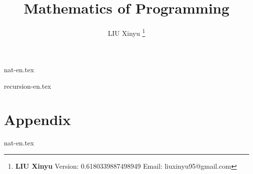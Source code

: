 \documentclass[UTF8, a4paper,twoside]{book} %
\begin{document}


\title{{\bf \Huge Mathematics of Programming}
  \centering
            }

\author{LIU Xinyu
  \thanks{{\bfseries LIU Xinyu} \newline
    Version: 0.6180339887498949 \newline
    Email: liuxinyu95@gmail.com \newline
    }}

\maketitle


\tableofcontents
\newpage

{nat-en.tex}

{recursion-en.tex}



\part{Appendix}
\appendix
\noappendicestocpagenum
\addappheadtotoc

{nat-en.tex}


%

\printindex
\end{document}
